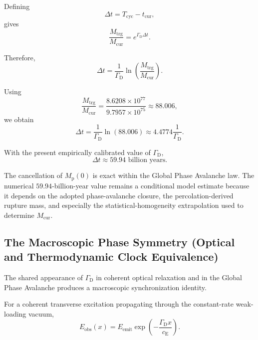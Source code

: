Defining
\begin{equation}
    \Delta t
    =
    T_{\mathrm{cyc}}
    -
    t_{\mathrm{cur}},
\end{equation}
gives
\begin{equation}
    \frac{M_{\mathrm{trg}}}{M_{\mathrm{cur}}}
    =
    e^{\Gamma_{\mathrm{D}}\Delta t}.
\end{equation}

Therefore,
\begin{equation}
    \Delta t
    =
    \frac{1}{\Gamma_{\mathrm{D}}}
    \ln\left(
        \frac{M_{\mathrm{trg}}}
        {M_{\mathrm{cur}}}
    \right).
\end{equation}

Using
\begin{equation}
    \frac{M_{\mathrm{trg}}}{M_{\mathrm{cur}}}
    =
    \frac{
        8.6208\times10^{77}
    }{
        9.7957\times10^{75}
    }
    \approx
    88.006,
\end{equation}
we obtain
\begin{equation}
    \Delta t
    =
    \frac{1}{\Gamma_{\mathrm{D}}}
    \ln(88.006)
    \approx
    4.4774
    \frac{1}{\Gamma_{\mathrm{D}}}.
\end{equation}

With the present empirically calibrated value of $\Gamma_{\mathrm{D}}$,
\begin{equation}
    \Delta t
    \approx
    59.94
    \text{ billion years}.
\end{equation}

The cancellation of $M_{\mathrm{p}}(0)$ is exact within the Global Phase Avalanche law. The numerical $59.94$-billion-year value remains a conditional model estimate because it depends on the adopted phase-avalanche closure, the percolation-derived rupture mass, and especially the statistical-homogeneity extrapolation used to determine $M_{\mathrm{cur}}$.

\subsection{The Macroscopic Phase Symmetry (Optical and Thermodynamic Clock Equivalence)}

The shared appearance of $\Gamma_{\mathrm{D}}$ in coherent optical relaxation and in the Global Phase Avalanche produces a macroscopic synchronization identity.

For a coherent transverse excitation propagating through the constant-rate weak-loading vacuum,
\begin{equation}
    E_{\mathrm{obs}}(x)
    =
    E_{\mathrm{emit}}
    \exp\left(
        -\frac{\Gamma_{\mathrm{D}}x}
        {c_{\mathrm{E}}}
    \right).
\end{equation}

